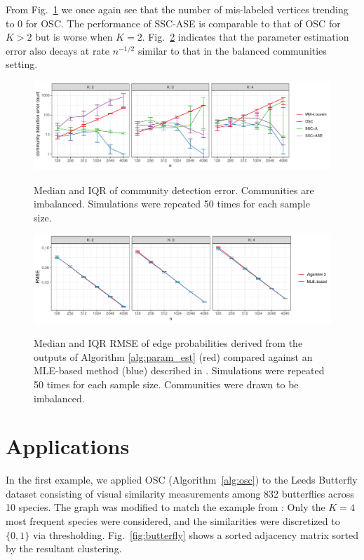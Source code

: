 \documentclass[12pt]{article}
\begin{document}
From Fig.~\ref{fig:clust_err_ct_sim_imba} we once again see that the
number of mis-labeled vertices trending to $0$ for OSC. The
performance of SSC-ASE is comparable to that of OSC for $K > 2$ but
is worse when $K = 2$. Fig.~\ref{fig:lambda_est_p_imba} indicates that
the parameter estimation error also decays at rate $n^{-1/2}$ similar
to that in the balanced communities setting.

\begin{figure}[H]
{\centering \includegraphics{summary_files/figure-latex/clust_err_ct_sim_imba-1}
}
\caption{Median and IQR of community detection error. Communities are imbalanced. Simulations were repeated 50 times for each sample size.}\label{fig:clust_err_ct_sim_imba}
\end{figure}

\begin{figure}[H]
{\centering \includegraphics{summary_files/figure-latex/lambda_est_p_imba-1}
}
\caption{Median and IQR RMSE of edge probabilities derived from the
  outputs of Algorithm \ref{alg:param_est} (red) compared against an
  MLE-based method (blue) described in
  \cite{307cbeb9b1be48299388437423d94bf1}.
  Simulations were repeated 50 times for each sample size. Communities were drawn to be imbalanced.}
\label{fig:lambda_est_p_imba}
\end{figure}

\hypertarget{real-data-examples}{%
\section{Applications}\label{real-data-examples}}

In the first example, we applied OSC (Algorithm~\ref{alg:osc}) to the Leeds Butterfly
dataset \citep{Wang_2018} consisting of visual similarity measurements
among 832 butterflies across 10 species. The graph was modified to match
the example from \citet{noroozi2019estimation}: Only the $K=4$ most
frequent species were considered, and the similarities were discretized
to \(\{0, 1\}\) via thresholding. Fig.~\ref{fig:butterfly} shows a
sorted adjacency matrix sorted by the resultant clustering.
\end{document}
